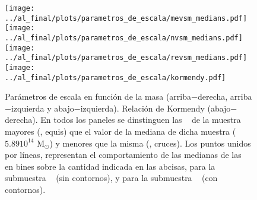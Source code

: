 \begin{figure}[H]
 \texttt{[image: ../al\_final/plots/parametros\_de\_escala/mevsm\_medians.pdf]}
 \texttt{[image: ../al\_final/plots/parametros\_de\_escala/nvsm\_medians.pdf]}
 \\
 \texttt{[image: ../al\_final/plots/parametros\_de\_escala/revsm\_medians.pdf]}
 \texttt{[image: ../al\_final/plots/parametros\_de\_escala/kormendy.pdf]}
\caption{Par\'ametros de escala en funci\'on de la masa \mvc (arriba$-$derecha, arriba$-$izquierda y abajo$-$izquierda). Relaci\'on de Kormendy (abajo$-$derecha). En todos los paneles
se dinstinguen las \bcgs~ de la muestra \aum~ mayores (\aumu, equis) que el valor de la mediana de dicha muestra ($5.8910^{14}$ M$_{\odot}$) y menores que la misma (\aumd, cruces). Los puntos 
unidos por l\'ineas, representan el comportamiento de las medianas de las \bcgs~ en bines sobre la cantidad indicada en las abcisas, para la submuestra \aumu~ (sin contornos),
y para la submuestra \aumd~ (con contornos).}
\label{fig:mue}
\end{figure}



